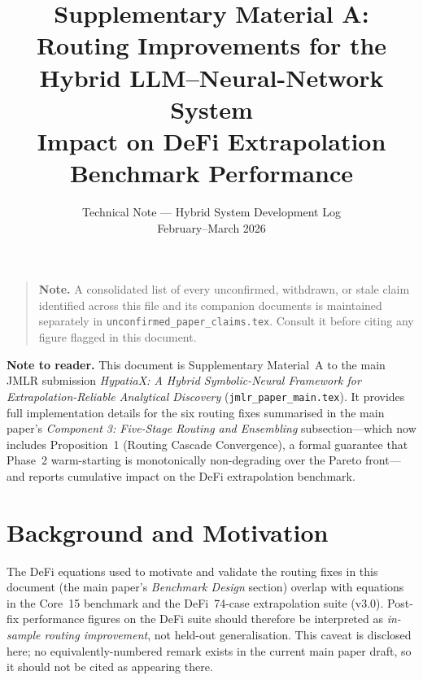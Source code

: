\documentclass[twoside,11pt]{article}
\begin{document}
\title{%
  Supplementary Material A:\\
  Routing Improvements for the Hybrid LLM--Neural-Network System\\
  \large Impact on DeFi Extrapolation Benchmark Performance
}
\author{\name Technical Note --- Hybrid System Development Log \email{} \\
       \addr February--March 2026}
\maketitle

\begin{quote}\small
\textbf{Note.} A consolidated list of every unconfirmed, withdrawn, or
stale claim identified across this file and its companion documents is
maintained separately in \texttt{unconfirmed\_paper\_claims.tex}. Consult
it before citing any figure flagged in this document.
\end{quote}

\tableofcontents
\bigskip

\noindent\textbf{Note to reader.}  This document is Supplementary Material~A to
the main JMLR submission \emph{HypatiaX: A Hybrid Symbolic-Neural Framework for
Extrapolation-Reliable Analytical Discovery} (\texttt{jmlr\_paper\_main.tex}).
It provides full implementation details for the six routing fixes summarised in the main paper's \emph{Component 3: Five-Stage Routing and Ensembling} subsection---which now includes Proposition~1 (Routing Cascade Convergence), a formal guarantee that Phase~2 warm-starting is monotonically non-degrading over the Pareto front---and reports cumulative impact on the DeFi
extrapolation benchmark.

\section{Background and Motivation}
\label{sec:background}

\begin{remark}
The DeFi equations used to motivate and validate the routing fixes in this
document (the main paper's \emph{Benchmark Design} section) overlap with equations in the Core~15
benchmark and the DeFi~74-case extrapolation suite (v3.0).  Post-fix performance
figures on the DeFi suite should therefore be interpreted as
\emph{in-sample routing improvement}, not held-out generalisation.
This caveat is disclosed here; no equivalently-numbered remark exists in
the current main paper draft, so it should not be cited as appearing there.
\end{remark}
\end{document}
